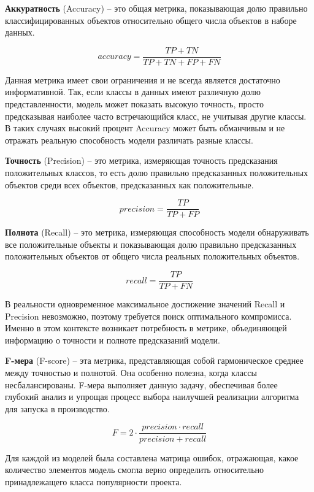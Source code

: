 \textbf{Аккуратность} (Accuracy) -- это общая метрика, показывающая долю правильно классифицированных объектов относительно общего числа объектов в наборе данных. 

\[
accuracy = \frac{TP + TN}{TP + TN + FP + FN}
\]

\vspace{1.5em}
    
Данная метрика имеет свои ограничения и не всегда является достаточно информативной. Так, если классы в данных имеют различную долю представленности, модель может показать высокую точность, просто предсказывая наиболее часто встречающийся класс, не учитывая другие классы. В таких случаях высокий процент Accuracy может быть обманчивым и не отражать реальную способность модели различать разные классы. 

\textbf{Точность} (Precision) -- это метрика, измеряющая точность предсказания положительных классов, то есть долю правильно предсказанных положительных объектов среди всех объектов, предсказанных как положительные. 

\[
precision = \frac{TP}{TP+FP}
\]

\vspace{1.5em}

\textbf{Полнота} (Recall) -- это метрика, измеряющая способность модели обнаруживать все положительные объекты и показывающая долю правильно предсказанных положительных объектов от общего числа реальных положительных объектов.

\[
recall = \frac{TP}{TP+FN}
\]

\vspace{1.5em}

В реальности одновременное максимальное достижение значений Recall и Precision невозможно, поэтому требуется поиск оптимального компромисса. Именно в этом контексте возникает потребность в метрике, объединяющей информацию о точности и полноте предсказаний модели. 

\textbf{F-мера} (F-score) -- эта метрика, представляющая собой гармоническое среднее между точностью и полнотой. Она особенно полезна, когда классы несбалансированы. F-мера выполняет данную задачу, обеспечивая более глубокий анализ и упрощая процесс выбора наилучшей реализации алгоритма для запуска в производство.

\[
F = 2\cdot \frac{precision \cdot recall}{precision+recall}
\]

\vspace{1.5em}

Для каждой из моделей была составлена матрица ошибок, отражающая, какое количество элементов модель смогла верно определить относительно принадлежащего класса популярности проекта. 

